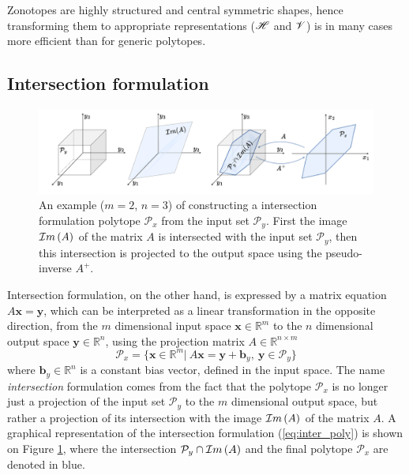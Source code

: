 Zonotopes are highly structured and central symmetric shapes, hence transforming them to appropriate representations ($\mathscr{H}$ and $\mathscr{V}$) is in many cases more efficient than for generic polytopes.


\subsection{Intersection formulation}
\label{ch:inter_formulaiton}

\begin{figure}[!h]
    \centering
    \includegraphics[width=\linewidth]{Chapters/imgs/image_intersection_poly_all.pdf}
    \caption{An example ($m=2$, $n=3$) of constructing a intersection formulation polytope $\mathcal{P}_x$ from the input set $\mathcal{P}_y$. First the image $\mathcal{I}m\left(A\right)$ of the matrix $A$ is intersected with the input set $\mathcal{P}_y$, then this intersection is projected to the output space using the pseudo-inverse $A^+$. }
    \label{fig:inter_image_poly}
\end{figure}
Intersection formulation, on the other hand, is expressed by a matrix equation $A\bm{x}=\bm{y}$, which can be interpreted as a linear transformation in the opposite direction\cite{LARSON2013}, from the $m$ dimensional input space $\bm{x}\in\mathbb{R}^m$ to the $n$ dimensional output space $\bm{y}\in\mathbb{R}^n$, using the projection matrix $A\in \mathbb{R}^{n\times m }$
\begin{equation}
    \mathcal{P}_x=\{\bm{x} \in \mathbb{R}^m|~ A\bm{x} = \bm{y}+ \bm{b}_y,~ \bm{y} \in \mathcal{P}_y\}
    \label{eq:inter_poly}
\end{equation}
where $\bm{b}_y \in \mathbb{R}^n$ is a constant bias vector, defined in the input space. The name \textit{intersection} formulation comes from the fact that the polytope $\mathcal{P}_x$ is no longer just a projection of the input set $\mathcal{P}_y$ to the $m$ dimensional output space, but rather a projection of its intersection with the image $\mathcal{I}m\left(A\right)$ of the matrix $A$. 
A graphical representation of the intersection formulation (\ref{eq:inter_poly}) is shown on Figure \ref{fig:inter_image_poly}, where the intersection $\mathcal{P}_y\cap \mathcal{I}m\left(A\right)$ and the final polytope $\mathcal{P}_x$ are denoted in blue.

